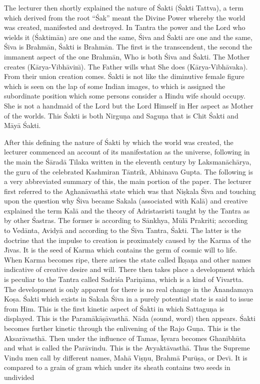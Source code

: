 The lecturer then shortly explained the nature of \'Sakti (\'Sakti Tattva), a term which derived from the root ``\'Sak'' meant the Divine Power whereby the world was created, manifested and destroyed. In Tantra the power and the Lord who wields it (\'Saktim\=an) are one and the same, \'Siva and \'Sakti are one and the same, \'Siva is Brahm\=an, \'Sakti is Brahm\=an. The first is the transcendent, the second the immanent aspect of the one Brahm\=an, Who is both \'Siva and \'Sakti. The Mother creates (K\=arya-Vibh\=avin\={\i}). The Father wills what She does (K\=arya-Vibh\=avaka). From their union creation comes. \'Sakti is not like the diminutive female figure which is seen on the lap of some Indian images, to which is assigned the subordinate position which some persons consider a Hindu wife should occupy. She is not a handmaid of the Lord but the Lord Himself in Her aspect as Mother of the worlds. This \'Sakti is both Nirgu\d{n}a and Sagu\d{n}a that is Chit \'Sakti and M\=ay\=a \'Sakti.

After this defining the nature of \'Sakti by which the world was created, the lecturer commenced an account of its manifestation as the universe, following in the main the \'S\=arad\=a Tilaka written in the eleventh century by Laksman\=ach\=arya, the guru of the celebrated Kashmiran T\=antrik, Abhinava Gupta. The following is a very abbreviated summary of this, the main portion of the paper. The lecturer first referred to the Aghan\=avasth\=a state which was that Ni\d{s}kala \'Siva and touching upon the question why \'Siva became Sakala (associated with Kal\=a) and creative explained the term Kal\=a and the theory of Adristasristi taught by the Tantra as by other \'Sastras. The former is according to S\=ankhya, M\=ul\=a Prakriti; according to Ved\=anta, Avidy\=a and according to the \'Siva Tantra, \'Sakti. The latter is the doctrine that the impulse to creation is proximately caused by the Karma of the J\={\i}vas. It is the seed of Karma which contains the germ of cosmic will to life. When Karma becomes ripe, there arises the state called \=Ik\d{s}a\d{n}a and other names indicative of creative desire and will. There then takes place a development which is peculiar to the Tantra called Sadri\'sa Pari\d{n}\=ama, which is a kind of Vivartta. The development is only apparent for there is no real change in the \=Anandamaya Ko\d{s}a. \'Sakti which exists in Sakala \'Siva in a purely potential state is said to issue from Him. This is the first kinetic aspect of \'Sakti in which Sattagu\d{n}a is displayed. This is the Param\=ak\=a\d{s}\=avasth\=a. N\=ada (sound, word) then appears. \'Sakti becomes further kinetic through the enlivening of the Rajo Gu\d{n}a. This is the Aksar\=avasth\=a. Then under the influence of Tamas, \=I\d{s}vara becomes Ghanibh\=uta and what is called the Par\=avindu. This is the Avyakt\=avasth\=a. Thus the Supreme Vindu men call by different names, Mah\=a Vi\d{s}\d{n}u, Brahm\=a Pur\=u\d{s}a, or Dev\={\i}. It is compared to a grain of gram which under its sheath contains two seeds in undivided

